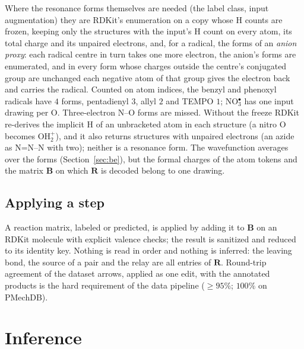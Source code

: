 \documentclass[11pt,a4paper]{article}
\newcommand{\vb}[1]{\bm{#1}}
\begin{document}
Where the resonance forms themselves are needed (the label class, input augmentation) they are RDKit's enumeration on a copy whose H counts are frozen, keeping only the structures with the input's H count on every atom, its total charge and its unpaired electrons, and, for a radical, the forms of an \emph{anion proxy}: each radical centre in turn takes one more electron, the anion's forms are enumerated, and in every form whose charges outside the centre's conjugated group are unchanged each negative atom of that group gives the electron back and carries the radical. Counted on atom indices, the benzyl and phenoxyl radicals have $4$ forms, pentadienyl $3$, allyl $2$ and TEMPO $1$; NO$_3^\bullet$ has one input drawing per O. Three-electron N--O forms are missed. Without the freeze RDKit re-derives the implicit H of an unbracketed atom in each structure (a nitro O becomes OH$_2^+$), and it also returns structures with unpaired electrons (an azide as N=N--N with two); neither is a resonance form. The wavefunction averages over the forms (Section~\ref{sec:be}), but the formal charges of the atom tokens and the matrix $\vb{B}$ on which $\vb{R}$ is decoded belong to one drawing.

\subsection{Applying a step}
\label{sec:apply}
A reaction matrix, labeled or predicted, is applied by adding it to $\vb{B}$ on an RDKit molecule with explicit valence checks; the result is sanitized and reduced to its identity key. Nothing is read in order and nothing is inferred: the leaving bond, the source of a pair and the relay are all entries of $\vb{R}$. Round-trip agreement of the dataset arrows, applied as one edit, with the annotated products is the hard requirement of the data pipeline ($\ge95\%$; $100\%$ on PMechDB).

\section{Inference}
\label{sec:inference}
\end{document}
